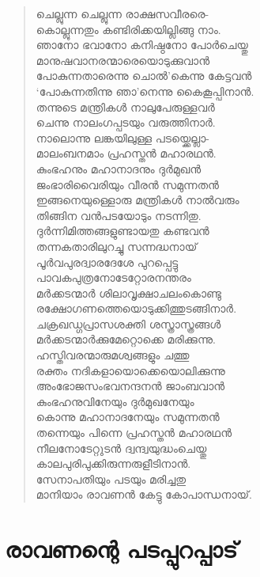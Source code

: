\begin{verse}
ചെല്ലുന്ന ചെല്ലുന്ന രാക്ഷസവീരരെ-\\
കൊല്ലുന്നതും കണ്ടിരിക്കയില്ലിങ്ങു നാം.\\
ഞാനോ ഭവാനോ കനിഷ്ഠനോ പോര്‍ചെയ്തു\\
മാനുഷവാനരന്മാരെയൊടുക്കുവാന്‍\\
പോകുന്നതാരെന്നു ചൊല്‍’കെന്നു കേട്ടവന്‍\\
‘പോകുന്നതിന്നു ഞാ’നെന്നു കൈകൂപ്പിനാന്‍.\\
തന്നുടെ മന്ത്രികള്‍ നാലുപേരുള്ളവര്‍\\
ചെന്നു നാലംഗപ്പടയും വരുത്തിനാര്‍.\\
നാലൊന്നു ലങ്കയിലുള്ള പടയ്ക്കെല്ലാ-\\
മാലംബനമാം പ്രഹസ്തന്‍ മഹാരഥന്‍.\\
കുംഭഹനും മഹാനാദനും ദുര്‍മുഖന്‍\\
ജംഭാരിവൈരിയും വീരന്‍ സമുന്നതന്‍\\
ഇങ്ങനെയുള്ളൊരു മന്ത്രികള്‍ നാല്‍വരും\\
തിങ്ങിന വന്‍പടയോടും നടന്നിതു.\\
ദുര്‍ന്നിമിത്തങ്ങളുണ്ടായതു കണ്ടവന്‍\\
തന്നകതാരിലുറച്ചു സന്നദ്ധനായ്\\
പൂര്‍വപുരദ്വാരദേശേ പുറപ്പെട്ടു\\
പാവകപുത്രനോടേറ്റോരനന്തരം\\
മര്‍ക്കടന്മാര്‍ ശിലാവൃക്ഷാചലംകൊണ്ടു\\
രക്ഷോഗണത്തെയൊടുക്കിത്തുടങ്ങിനാര്‍.\\
ചക്രഖഡ്ഗപ്രാസശക്തി ശസ്ത്രാസ്ത്രങ്ങള്‍\\
മര്‍ക്കടന്മാര്‍ക്കുമേറ്റൊക്കെ മരിക്കുന്നു.\\
ഹസ്തിവരന്മാരുമശ്വങ്ങളും ചത്തു\\
രക്തം നദികളായൊക്കെയൊലിക്കുന്നു\\
അംഭോജസംഭവനന്ദനന്‍ ജാംബവാന്‍\\
കുംഭഹനുവിനേയും ദുര്‍മുഖനേയും\\
കൊന്നു മഹാനാദനേയും സമുന്നതന്‍\\
തന്നെയും പിന്നെ പ്രഹസ്തന്‍ മഹാരഥന്‍\\
നീലനോടേറ്റുടന്‍ ദ്വന്ദ്വയുദ്ധംചെയ്തു\\
കാലപുരിപുക്കിരുന്നരുളീടിനാന്‍.\\
സേനാപതിയും പടയും മരിച്ചതു\\
മാനിയാം രാവണന്‍ കേട്ടു കോപാന്ധനായ്.
\end{verse}


\section{രാവണന്റെ പടപ്പുറപ്പാട്}

